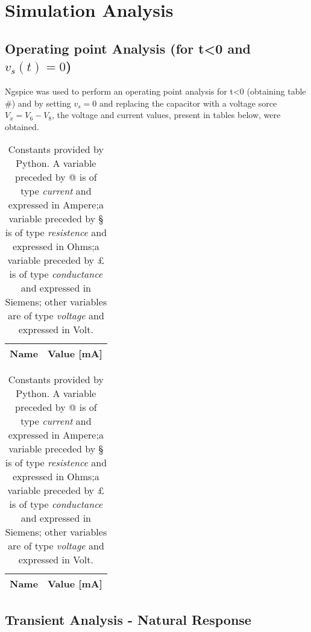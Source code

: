 \section{Simulation Analysis}
\label{sec:simulation}


\subsection{Operating point Analysis (for t<0 and $v_s(t) = 0$)}

Ngspice was used to perform an operating point analysis for t<0 (obtaining table #) and by setting $v_s = 0$ and replacing the capacitor with a voltage sorce $V_x = V_6 - V_8$, the voltage and current values, present in tables below, were obtained.

\begin{table}[!h]
	\centering
	\begin{tabular}{|l|r|}
		\hline    
		{\bf Name} & {\bf Value [mA]} \\ \hline
		
	\end{tabular}
	\caption{Constants provided by Python. A variable preceded by @ is of type {\em current}
		and expressed in Ampere;a variable preceded by § is of type {\it resistence} and expressed in
		Ohms;a variable preceded by £ is of type {\it conductance} and expressed in
		Siemens; other variables are of type {\it voltage} and expressed in
		Volt.}
	\label{tab:op}
\end{table}



\begin{table}[!h]
	\centering
	\begin{tabular}{|l|r|}
		\hline    
		{\bf Name} & {\bf Value [mA]} \\ \hline
		
	\end{tabular}
	\caption{Constants provided by Python. A variable preceded by @ is of type {\em current}
		and expressed in Ampere;a variable preceded by § is of type {\it resistence} and expressed in
		Ohms;a variable preceded by £ is of type {\it conductance} and expressed in
		Siemens; other variables are of type {\it voltage} and expressed in
		Volt.}
	\label{tab:op}
\end{table}


\subsection{Transient Analysis - Natural Response}

